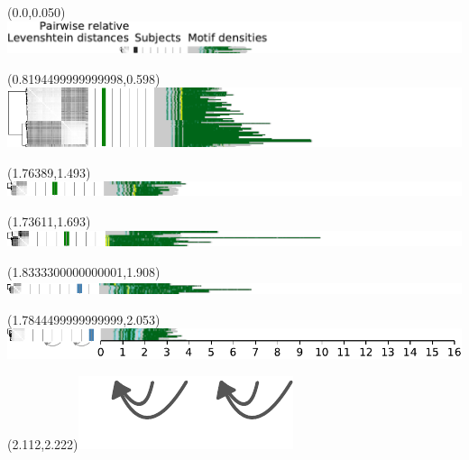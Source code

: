 \documentclass{article}
\begin{document}
\begin{textblock}{13}(0.0,0.050)\includegraphics{./Figure_S5/chr7-HG001.pdf}\end{textblock}
\begin{textblock}{13}(0.8194499999999998,0.598)\includegraphics{./Figure_S5/chr7-HG002.pdf}\end{textblock}
\begin{textblock}{13}(1.76389,1.493)\includegraphics{./Figure_S5/chr7-HG003.pdf}\end{textblock}
\begin{textblock}{13}(1.73611,1.693)\includegraphics{./Figure_S5/chr7-HG004.pdf}\end{textblock}
\begin{textblock}{13}(1.8333300000000001,1.908)\includegraphics{./Figure_S5/chr7-HG006.pdf}\end{textblock}
\begin{textblock}{13}(1.7844499999999999,2.053)\includegraphics{./Figure_S5/chr7-HG007.pdf}\end{textblock}
\begin{textblock}{13}(2.112,2.222)\includegraphics[width=.755in,keepaspectratio]{Figure_4/fatter-arrows.pdf}\end{textblock}
\end{document}

